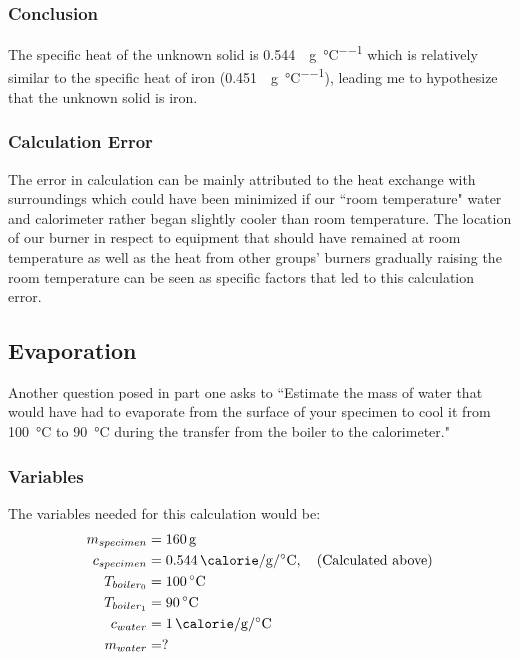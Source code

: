 \documentclass{article}
\begin{document}
\subsubsection{Conclusion}

The specific heat of the unknown solid is \SI{0.544}{\calorie \per \gram \per \celsius} which is relatively similar to the specific heat of iron (\SI{0.451}{\calorie \per \gram \per \celsius}), leading me to hypothesize that the unknown solid is iron.

\subsubsection{Calculation Error}

The error in calculation can be mainly attributed to the heat exchange with surroundings which could have been minimized if our ``room temperature" water and calorimeter rather began slightly cooler than room temperature. The location of our burner in respect to equipment that should have remained at room temperature as well as the heat from other groups' burners gradually raising the room temperature can be seen as specific factors that led to this calculation error.

\subsection{Evaporation}

Another question posed in part one asks to ``Estimate the mass of water that would have had to evaporate from the surface of your specimen to cool it from \SI{100}{\celsius} to \SI{90}{\celsius} during the transfer from the boiler to the calorimeter."

\subsubsection{Variables}

The variables needed for this calculation would be:
\begin{align*}
	m_{specimen} & = \SI{160}{\gram} \\
	c_{specimen} & = \SI{0.544}{\calorie \per \gram \per \celsius}, \quad \text{(Calculated above)} \\
	T_{boiler_0} & = \SI{100}{\celsius} \\
	T_{boiler_1} & = \SI{90}{\celsius} \\
	c_{water} & = \SI{1}{\calorie \per \gram \per \celsius} \\
	m_{water} & = ?
\end{align*}
\end{document}
